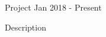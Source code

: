 
\begin{cventries}
  \cventry
    {}
    {Project} %
    {}
    {Jan 2018 {-} Present} %
    {
      \begin{cvitems}
        \item{Description}
      \end{cvitems}
    }

\end{cventries}